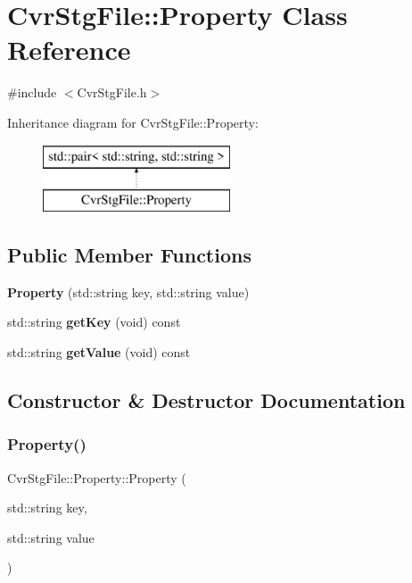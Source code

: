 \section{Cvr\+Stg\+File\+:\+:Property Class Reference}
\label{classCvrStgFile_1_1Property}


{\ttfamily \#include $<$Cvr\+Stg\+File.\+h$>$}

Inheritance diagram for Cvr\+Stg\+File\+:\+:Property\+:\begin{figure}[H]
\begin{center}
\leavevmode
\includegraphics[height=2.000000cm]{classCvrStgFile_1_1Property}
\end{center}
\end{figure}
\subsection*{Public Member Functions}
\begin{DoxyCompactItemize}
\item 
\textbf{ Property} (std\+::string key, std\+::string value)
\item 
std\+::string \textbf{ get\+Key} (void) const
\item 
std\+::string \textbf{ get\+Value} (void) const
\end{DoxyCompactItemize}


\subsection{Constructor \& Destructor Documentation}
\mbox{\label{classCvrStgFile_1_1Property_a7c1f7709cb31dcef8d71a10dc194e861}} 
\subsubsection{Property()}
{\footnotesize\ttfamily Cvr\+Stg\+File\+::\+Property\+::\+Property (\begin{DoxyParamCaption}\item[{std\+::string}]{key,  }\item[{std\+::string}]{value }\end{DoxyParamCaption})\hspace{0.3cm}{\ttfamily [inline]}}



